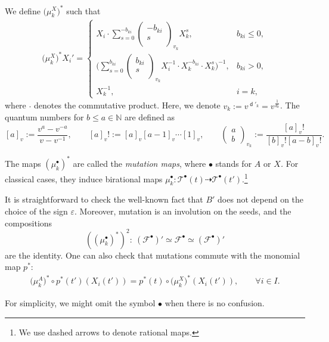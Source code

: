 \documentclass[10pt,a4paper]{amsart}
\newcommand{\N}{\mathbb{N}}
\newcommand{\opname}[1]{\operatorname{\mathsf{#1}}}
\newcommand{\cF}{{\mathcal F}}
\newcommand{\cT}{{\mathcal T}}
\newcommand{\torus}{\cT}%
\newcommand{\diag}{{\delta}}
\renewcommand{\diag}{{d}}
\renewcommand{\diag}{\opname{d}'}
\numberwithin{equation}{section}
\begin{document}
We define $\big(\mu_{k}^{X}\big)^{*}$ such that
\begin{align*}
 \big(\mu_{k}^{X}\big)^{*}X_{i}' =\begin{cases}
 X_{i}\cdot \displaystyle\sum_{s=0}^{-b_{ki}}\begin{pmatrix}
 -b_{ki}\\
 s\\
 \end{pmatrix}_{v_k} X_{k}^{s}, & b_{ki}\leq0,\\
 \Biggl(\displaystyle\sum_{s=0}^{b_{ki}}\begin{pmatrix}
 b_{ki}\\
 s\\
 \end{pmatrix}_{v_k} X_{i}^{-1}\cdot X_{k}^{-b_{ki}} \cdot X_{k}^{s} \Biggr)^{-1},& b_{ki}>0,\\
 X_{k}^{-1}, & i=k,
 \end{cases}
 \end{align*}
where $\cdot$ denotes the commutative product. Here, we denote $v_k:=v^{\diag_{k}}=v^{\frac{1}{d_k}}$. The quantum numbers for $b\leq a \in \N$ are defined as
\[[a]_v:=\frac{v^a-v^{-a}}{v-v^{-1}},\qquad [a]_v!:=[a]_v[a-1]_{v}\cdots [1]_v, \qquad \begin{pmatrix}
 a\\
 b \end{pmatrix}_{v_k}:=\frac{[a]_v!}{[b]_v! [a-b]_v !}.\]

The maps $(\mu_{k}^{\bullet})^{*}$ are called the \emph{mutation
maps}, where $\bullet$ stands for $A$ or $X$\emph{.} For classical cases, they induce
birational maps $\mu_{k}^{\bullet}\colon\torus^{\bullet}(t)\dashrightarrow\torus^{\bullet}(t')$.\footnote{We use dashed arrows to denote rational maps.}

It is straightforward to check the well-known fact that $B'$ does not depend on the choice of the sign $\varepsilon$. Moreover,
mutation is an involution on the seeds, and the compositions \[((\mu_{k}^{\bullet})^{*})^{2}\colon \ (\cF^{\bullet})'\simeq\cF^{\bullet}\simeq(\cF^{\bullet})'\]
are the identity. One can also check that mutations commute with the monomial map $p^*$:
\begin{align}\label{eq:X_A_mutation_commutativity}
 \big(\mu_k^A\big)^*\circ p^*(t')(X_i(t'))=p^*(t)\circ \big(\mu_k^X\big)^*(X_i(t')),\qquad \forall i\in I.
\end{align}

For simplicity, we might omit the symbol $\bullet$ when there is
no confusion.
\end{document}
